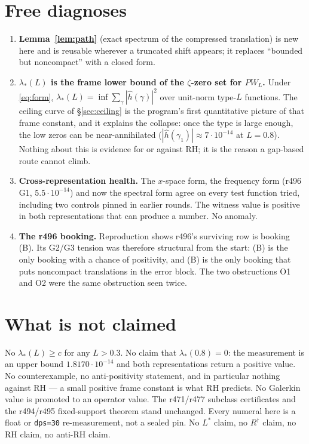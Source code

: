 \documentclass[11pt]{article}
\theoremstyle{remark}
\begin{document}
\section{Free diagnoses}

\begin{enumerate}
\item \textbf{Lemma~\ref{lem:path}} (exact spectrum of the compressed
translation) is new here and is reusable wherever a truncated shift
appears; it replaces ``bounded but noncompact'' with a closed form.
\item \textbf{$\lambda_*(L)$ is the frame lower bound of the
$\zeta$-zero set for $PW_L$.}  Under \eqref{eq:form},
$\lambda_*(L)=\inf\sum_\gamma|\widehat h(\gamma)|^2$ over unit-norm
type-$L$ functions.  The ceiling curve of \S\ref{sec:ceiling} is the
program's first quantitative picture of that frame constant, and it
explains the collapse: once the type is large enough, the low zeros
can be near-annihilated ($|\widehat h(\gamma_1)|\approx7\cdot10^{-14}$
at $L=0.8$).  Nothing about this is evidence for or against RH; it is
the reason a gap-based route cannot climb.
\item \textbf{Cross-representation health.}  The $x$-space form, the
frequency form (r496 G1, $5.5\cdot10^{-14}$) and now the spectral form
agree on every test function tried, including two controls pinned in
earlier rounds.  The witness value is positive in both
representations that can produce a number.  No anomaly.
\item \textbf{The r496 booking.}  Reproduction shows r496's surviving
row is booking (B).  Its G2/G3 tension was therefore structural from
the start: (B) is the only booking with a chance of positivity, and
(B) is the only booking that puts noncompact translations in the
error block.  The two obstructions O1 and O2 were the same
obstruction seen twice.
\end{enumerate}

\section{What is not claimed}

No $\lambda_*(L)\ge c$ for any $L>0.3$.  No claim that
$\lambda_*(0.8)=0$: the measurement is an upper bound
$1.8170\cdot10^{-14}$ and both representations return a positive
value.  No counterexample, no anti-positivity statement, and in
particular nothing against RH --- a small positive frame constant is
what RH predicts.  No Galerkin value is promoted to an operator
value.  The r471/r477 subclass certificates and the r494/r495
fixed-support theorem stand unchanged.  Every numeral here is a float
or \texttt{dps=30} re-measurement, not a sealed pin.
No $L^*$ claim, no $R^\dagger$ claim, no RH claim, no anti-RH claim.
\end{document}
